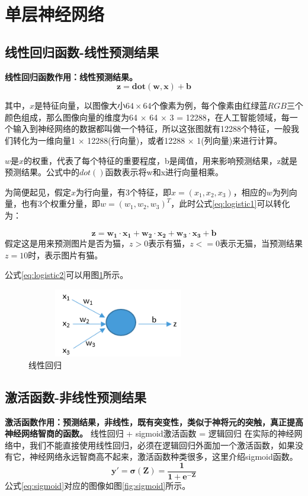 \section{单层神经网络}
\subsection{线性回归函数-线性预测结果}
\textbf{线性回归函数作用：线性预测结果。}
\begin{equation}
	\bm{z = dot(w, x) + b} \label{eq:logistic1}
\end{equation}


其中，$x$是特征向量，以图像大小$64 \times 64$个像素为例，每个像素由红绿蓝$RGB$三个颜色组成，那么图像向量的维度为64 $\times$ 64 $\times$ 3 = 12288，在人工智能领域，每一个输入到神经网络的数据都叫做一个特征，所以这张图就有12288个特征，一般我们转化为一维向量1 $\times$ 12288(行向量)，或者12288 $\times$ 1(列向量)来进行计算。

$w$是$x$的权重，代表了每个特征的重要程度，b是阈值，用来影响预测结果，z就是预测结果。公式中的$dot()$函数表示将w和x进行向量相乘。

为简便起见，假定$x$为行向量，有3个特征，即$x=(x_1, x_2, x_3)$，相应的$w$为列向量，也有3个权重分量，即$w=(w_1, w_2, w_3)^T$，此时公式\ref{eq:logistic1}可以转化为：

\begin{equation}
	\bm{z = w_1 \cdot x_1 + w_2 \cdot x_2 + w_3 \cdot x_3 + b} \label{eq:logistic2}
\end{equation}
假定这是用来预测图片是否为猫，$z>0$表示有猫，$z<=0$表示无猫，当预测结果$z=10$时，表示图片有猫。

公式\ref{eq:logistic2}可以用图\ref{fig:1nn}所示。

\begin{figure}[htb]			%
	\centering
	\includegraphics[width=8cm, height=3cm]{pictures/逻辑回归/1nn}
	\caption{线性回归}
	\label{fig:1nn}
\end{figure}

\subsection{激活函数-非线性预测结果}
\textbf{激活函数作用：预测结果，非线性，既有突变性，类似于神将元的突触，真正提高神经网络智商的函数。}
线性回归 + sigmoid激活函数 = 逻辑回归
在实际的神经网络中，我们不能直接使用线性回归，必须在逻辑回归外面加一个激活函数，如果没有它，神经网络永远智商高不起来，激活函数种类很多，这里介绍sigmoid函数。
\begin{equation}
	\bm{y' = \sigma (Z) = \frac{1}{1 + e^{-Z}}} \label{eq:sigmoid}
\end{equation}
公式\ref{eq:sigmoid}对应的图像如图\ref{fig:sigmoid}所示。

